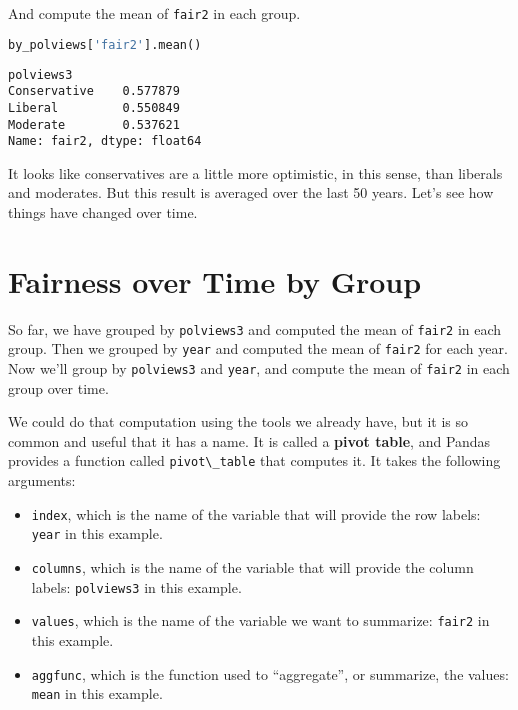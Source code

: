 And compute the mean of \passthrough{\lstinline!fair2!} in each group.

\begin{lstlisting}[language=Python,style=source]
by_polviews['fair2'].mean()
\end{lstlisting}

\begin{lstlisting}[style=output]
polviews3
Conservative    0.577879
Liberal         0.550849
Moderate        0.537621
Name: fair2, dtype: float64
\end{lstlisting}

It looks like conservatives are a little more optimistic, in this sense,
than liberals and moderates. But this result is averaged over the last
50 years. Let's see how things have changed over time.

\section{Fairness over Time by Group}\label{fairness-over-time-by-group}

So far, we have grouped by \passthrough{\lstinline!polviews3!} and
computed the mean of \passthrough{\lstinline!fair2!} in each group. Then
we grouped by \passthrough{\lstinline!year!} and computed the mean of
\passthrough{\lstinline!fair2!} for each year. Now we'll group by
\passthrough{\lstinline!polviews3!} and \passthrough{\lstinline!year!},
and compute the mean of \passthrough{\lstinline!fair2!} in each group
over time.

We could do that computation using the tools we already have, but it is
so common and useful that it has a name. It is called a \textbf{pivot
table}, and Pandas provides a function called
\passthrough{\lstinline!pivot\_table!} that computes it. It takes the
following arguments:

\begin{itemize}
\item
  \passthrough{\lstinline!index!}, which is the name of the variable
  that will provide the row labels: \passthrough{\lstinline!year!} in
  this example.
\item
  \passthrough{\lstinline!columns!}, which is the name of the variable
  that will provide the column labels:
  \passthrough{\lstinline!polviews3!} in this example.
\item
  \passthrough{\lstinline!values!}, which is the name of the variable we
  want to summarize: \passthrough{\lstinline!fair2!} in this example.
\item
  \passthrough{\lstinline!aggfunc!}, which is the function used to
  ``aggregate'', or summarize, the values:
  \passthrough{\lstinline!mean!} in this example.
\end{itemize}

